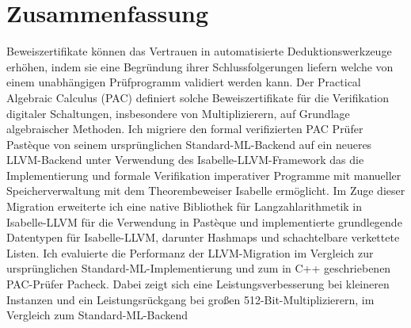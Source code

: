 \section*{Zusammenfassung}

Beweiszertifikate können das Vertrauen in automatisierte Deduktionswerkzeuge erhöhen, indem sie eine Begründung ihrer Schlussfolgerungen liefern welche von einem unabhängigen Prüfprogramm validiert werden kann.
Der Practical Algebraic Calculus (PAC) definiert solche Beweiszertifikate für die Verifikation digitaler Schaltungen, insbesondere von Multiplizierern, auf Grundlage algebraischer Methoden.
Ich migriere den formal verifizierten PAC Prüfer Pastèque von seinem ursprünglichen Standard-ML-Backend auf ein neueres LLVM-Backend unter Verwendung des Isabelle-LLVM-Framework das die Implementierung und formale Verifikation imperativer Programme mit manueller Speicherverwaltung mit dem Theorembeweiser Isabelle ermöglicht.
Im Zuge dieser Migration erweiterte ich eine native Bibliothek für Langzahlarithmetik in Isabelle-LLVM für die Verwendung in Pastèque und implementierte grundlegende Datentypen für Isabelle-LLVM, darunter Hashmaps und schachtelbare verkettete Listen.
Ich evaluierte die Performanz der LLVM-Migration im Vergleich zur ursprünglichen Standard-ML-Implementierung und zum in C++ geschriebenen PAC-Prüfer Pacheck. Dabei zeigt sich eine Leistungsverbesserung bei kleineren Instanzen und ein Leistungsrückgang bei großen 512-Bit-Multiplizierern, im Vergleich zum Standard-ML-Backend
